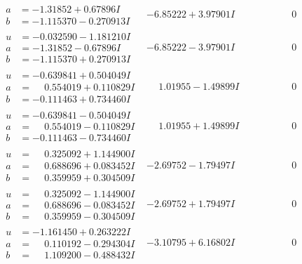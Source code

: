\documentclass[1p]{elsarticle_modified}
\theoremstyle{definition}
\begin{document}
$$\begin{array}{c|c|c}
\begin{aligned}
a &= -1.31852 + 0.67896 I \\
b &= -1.115370 - 0.270913 I\end{aligned}
 & -6.85222 + 3.97901 I & \phantom{-0.000000 } 0 \\ \hline\begin{aligned}
u &= -0.032590 - 1.181210 I \\
a &= -1.31852 - 0.67896 I \\
b &= -1.115370 + 0.270913 I\end{aligned}
 & -6.85222 - 3.97901 I & \phantom{-0.000000 } 0 \\ \hline\begin{aligned}
u &= -0.639841 + 0.504049 I \\
a &= \phantom{-}0.554019 + 0.110829 I \\
b &= -0.111463 + 0.734460 I\end{aligned}
 & \phantom{-}1.01955 - 1.49899 I & \phantom{-0.000000 } 0 \\ \hline\begin{aligned}
u &= -0.639841 - 0.504049 I \\
a &= \phantom{-}0.554019 - 0.110829 I \\
b &= -0.111463 - 0.734460 I\end{aligned}
 & \phantom{-}1.01955 + 1.49899 I & \phantom{-0.000000 } 0 \\ \hline\begin{aligned}
u &= \phantom{-}0.325092 + 1.144900 I \\
a &= \phantom{-}0.688696 + 0.083452 I \\
b &= \phantom{-}0.359959 + 0.304509 I\end{aligned}
 & -2.69752 - 1.79497 I & \phantom{-0.000000 } 0 \\ \hline\begin{aligned}
u &= \phantom{-}0.325092 - 1.144900 I \\
a &= \phantom{-}0.688696 - 0.083452 I \\
b &= \phantom{-}0.359959 - 0.304509 I\end{aligned}
 & -2.69752 + 1.79497 I & \phantom{-0.000000 } 0 \\ \hline\begin{aligned}
u &= -1.161450 + 0.263222 I \\
a &= \phantom{-}0.110192 - 0.294304 I \\
b &= \phantom{-}1.109200 - 0.488432 I\end{aligned}
 & -3.10795 + 6.16802 I & \phantom{-0.000000 } 0 \\ \hline\begin{aligned}

\end{aligned}
\end{array}$$
\end{document}
